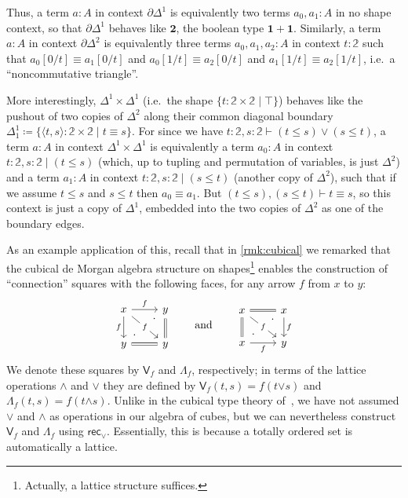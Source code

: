\documentclass{amsart}
\theoremstyle{plain}
\theoremstyle{definition}
\theoremstyle{remark}
\numberwithin{equation}{section}
\newcommand{\jdeq}{\equiv}
\newcommand{\defeq}{\coloneqq}
\newcommand{\types}{\vdash}
\newcommand{\unittype}{\ensuremath{\mathbf{1}}}
\newcommand{\booltype}{\ensuremath{\mathbf{2}}}
\newcommand{\sh}[2]{\{#1\mid #2\}}
\newcommand{\pair}[1]{\langle #1\rangle}
\newcommand{\rec}{\mathsf{rec}}
\newcommand{\connmax}[1]{\mathsf{V}_{#1}}
\newcommand{\connmin}[1]{\mathsf{\Lambda}_{#1}}
\newcommand{\two}{\mathbb{2}}
\begin{document}
Thus, a term $a:A$ in context $\partial\Delta^1$ is equivalently two terms $a_0,a_1:A$ in no shape context, so that $\partial\Delta^1$ behaves like $\booltype$, the boolean type $\unittype + \unittype$.
Similarly, a term $a:A$ in context $\partial\Delta^2$ is equivalently three terms $a_0,a_1,a_2:A$ in context $t:\two$ such that $a_0[0/t] \jdeq a_1[0/t]$ and $a_0[1/t] \jdeq a_2[0/t]$ and $a_1[1/t] \jdeq a_2[1/t]$, i.e.\ a ``noncommutative triangle''.

More interestingly, $\Delta^1\times \Delta^1$ (i.e.\ the shape $\sh{t:\two\times\two}{\top}$) behaves like the pushout of two copies of $\Delta^2$ along their common diagonal boundary $\Delta^1_1 \defeq \sh{\pair{t,s} : \two \times \two}{t \jdeq s}$.
For since we have $t:\two,s:\two \types (t\le s)\lor (s\le t)$, a term $a:A$ in context $\Delta^1\times \Delta^1$ is equivalently a term $a_0:A$ in context $t:\two, s:\two \mid (t\le s)$ (which, up to tupling and permutation of variables, is just $\Delta^2$) and a term $a_1:A$ in context $t:\two, s:\two \mid (s\le t)$ (another copy of $\Delta^2$), such that if we assume $t\le s$ and $s\le t$ then $a_0\jdeq a_1$.
But $(t\le s),(s\le t)\types t\jdeq s$, so this context is just a copy of $\Delta^1$, embedded into the two copies of $\Delta^2$ as one of the boundary edges.

As an example application of this, recall that in \cref{rmk:cubical} we remarked that the cubical de Morgan algebra structure on shapes\footnote{Actually, a lattice structure suffices.} enables the construction of ``connection'' squares with the following faces, for any arrow $f$ from $x$ to $y$:
  \begin{equation}
  \begin{tikzcd}
    x \arrow[r, "f"] \arrow[dr, "f" description] \arrow[d, "f"'] & y \arrow[d, equals] \\
    y \arrow[r, equals]  \arrow[ur, phantom, "\cdot" very near start, "\cdot" very near end] & y
  \end{tikzcd}
  \qquad\text{and}\qquad
  \begin{tikzcd}
    x \arrow[r, equals] \arrow[dr, "f" description] \arrow[d, equals] & x \arrow[d, "f"] \\
    x \arrow[r, "f"']  \arrow[ur, phantom, "\cdot" very near start, "\cdot" very near end] & y
  \end{tikzcd}\label{eq:connection-squares}
  \end{equation}
We denote these squares by $\connmax f$ and $\connmin f$, respectively; in terms of the lattice operations $\pmb{\land}$ and $\pmb{\lor}$ they are defined by $\connmax f(t,s) = f(t\mathbin{\pmb{\lor}}s)$ and $\connmin f(t,s) = f(t\mathbin{\pmb{\land}}s)$.
Unlike in the cubical type theory of~\cite{CCHM}, we have not assumed $\mathbin{\pmb{\lor}}$ and $\mathbin{\pmb{\land}}$ as operations in our algebra of cubes, but we can nevertheless construct $\connmax f$ and $\connmin f$ using $\rec_\lor$.
Essentially, this is because a totally ordered set is automatically a lattice.
\end{document}
